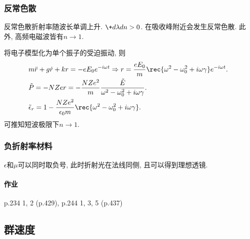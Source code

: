 \documentclass{ctexart}
\begin{document}

\subsubsection{反常色散} %
\label{ssub:反常色散}

反常色散折射率随波长单调上升. $\displaystyle \+d\lambda dn > 0$. 在吸收峰附近会发生反常色散. 此外, 高频电磁波皆有$n\rightarrow 1$.
\par
将电子模型化为单个振子的受迫振动, 则
\begin{align*}
    & m\ddot{r} + g\dot{r} + kr = -e E_0 e^{-i\omega t} \Rightarrow r = \frac{e E_0}{m}\rec{\omega^2 - \omega_0^2 + i\omega\gamma}e^{-i\omega t}. \\
    & \tilde{P} = -NZer = -\frac{NZe^2}{m}\frac{\tilde{E}}{\omega^2 - \omega_0^2 + i\omega\gamma}. \\
    & \tilde{\epsilon}_r = 1-\frac{NZe^2}{\epsilon_0 m}\rec{\omega^2 - \omega_0^2 + i\omega \gamma}.
\end{align*}
可推知短波极限下$n\rightarrow 1$.


\subsubsection{负折射率材料} %
\label{ssub:负折射率材料}

$\epsilon$和$\mu$可以同时取负号, 此时折射光在法线同侧, 且可以得到理想透镜.

\paragraph{作业} %
\label{par:作业}

p.234 1, 2 (p.429), p.244 1, 3, 5 (p.437)




\subsection{群速度} %
\label{sub:群速度}
\end{document}
